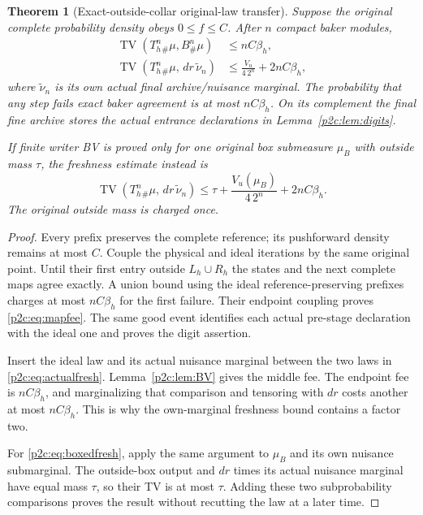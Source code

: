 \documentclass[11pt]{article}
\numberwithin{equation}{section}
\newtheorem{theorem}{Theorem}[section]
\theoremstyle{definition}
\theoremstyle{remark}
\begin{document}
\begin{theorem}[Exact-outside-collar original-law transfer]
\label{p2c:thm:law}
Suppose the original complete probability density obeys
$0\leq f\leq C$. After $n$ compact baker modules,
\begin{align}
 \operatorname{TV}(T_h^n{}_\#\mu,B^n_\#\mu)
 &\leq nC\beta_h,\label{p2c:eq:mapfee}\\
 \operatorname{TV}(T_h^n{}_\#\mu,\,
        dr\,\widetilde\nu_n)
 &\leq \frac{V_u}{4\,2^n}+2nC\beta_h,
 \label{p2c:eq:actualfresh}
\end{align}
where $\widetilde\nu_n$ is its own actual final
archive/nuisance marginal. The probability that any
step fails exact baker agreement is at most
$nC\beta_h$. On its complement the final fine archive
stores the \emph{actual} entrance declarations in
Lemma~\ref{p2c:lem:digits}.

If finite writer BV is proved only for one original
box submeasure $\mu_B$ with outside mass $\tau$,
the freshness estimate instead is
\begin{equation}\label{p2c:eq:boxedfresh}
 \operatorname{TV}(T_h^n{}_\#\mu,\,
                       dr\,\widetilde\nu_n)
 \leq\tau+\frac{V_u(\mu_B)}{4\,2^n}
                       +2nC\beta_h .
\end{equation}
The original outside mass is charged once.
\end{theorem}

\begin{proof}
Every prefix preserves the complete reference; its
pushforward density remains at most $C$.
Couple the physical and ideal iterations by the same
original point. Until their first entry outside
$L_h\cup R_h$ the states and the next complete maps
agree exactly. A union bound using the ideal
reference-preserving prefixes charges at most
$nC\beta_h$ for the first failure. Their endpoint
coupling proves \eqref{p2c:eq:mapfee}. The same good
event identifies each actual pre-stage declaration
with the ideal one and proves the digit assertion.

Insert the ideal law and its actual nuisance marginal
between the two laws in \eqref{p2c:eq:actualfresh}.
Lemma~\ref{p2c:lem:BV} gives the middle fee.
The endpoint fee is $nC\beta_h$, and marginalizing
that comparison and tensoring with $dr$ costs
another at most $nC\beta_h$. This is why the
own-marginal freshness bound contains a factor two.

For \eqref{p2c:eq:boxedfresh}, apply the same argument
to $\mu_B$ and its own nuisance submarginal.
The outside-box output and $dr$ times its actual
nuisance marginal have equal mass $\tau$, so their
TV is at most $\tau$. Adding these two subprobability
comparisons proves the result without recutting
the law at a later time.
\end{proof}
\end{document}

